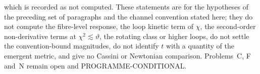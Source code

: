 which is recorded as not computed. These statements are for the hypotheses of the preceding set of paragraphs and the channel convention stated here; they do not compute the fibre-level response, the loop kinetic term of \(\chi\), the second-order non-derivative terms at \(\chi^2\lesssim\vartheta\), the rotating class or higher loops, do not settle the convention-bound magnitudes, do not identify \(t\) with a quantity of the emergent metric, and give no Cassini or Newtonian comparison. Problems~C, F and~N remain open and PROGRAMME-CONDITIONAL.
